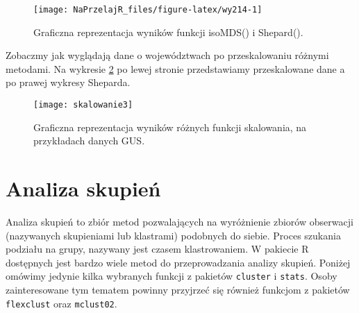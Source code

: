 \documentclass[polish,]{book}
\newenvironment{Shaded}{\begin{snugshade}}{\end{snugshade}}
\newcommand{\CommentTok}[1]{\textcolor[rgb]{0.56,0.35,0.01}{\textit{#1}}}
\newcommand{\DataTypeTok}[1]{\textcolor[rgb]{0.13,0.29,0.53}{#1}}
\newcommand{\DecValTok}[1]{\textcolor[rgb]{0.00,0.00,0.81}{#1}}
\newcommand{\FloatTok}[1]{\textcolor[rgb]{0.00,0.00,0.81}{#1}}
\newcommand{\KeywordTok}[1]{\textcolor[rgb]{0.13,0.29,0.53}{\textbf{#1}}}
\newcommand{\NormalTok}[1]{#1}
\newcommand{\OperatorTok}[1]{\textcolor[rgb]{0.81,0.36,0.00}{\textbf{#1}}}
\newcommand{\StringTok}[1]{\textcolor[rgb]{0.31,0.60,0.02}{#1}}
\begin{document}
\begin{Shaded}
\end{Shaded}

\begin{figure}[h]

{\centering \texttt{[image: NaPrzelajR\_files/figure-latex/wy214-1]} 

}

\caption{Graficzna reprezentacja wyników funkcji isoMDS() i Shepard().}\label{fig:wy214}
\end{figure}

Zobaczmy jak wyglądają dane o województwach po przeskalowaniu różnymi metodami. Na wykresie \ref{fig:skal3} po lewej stronie przedstawiamy przeskalowane dane a po
prawej wykresy Sheparda.

\begin{figure}

{\centering \texttt{[image: skalowanie3]} 

}

\caption{Graficzna reprezentacja wyników różnych funkcji skalowania, na przykładach danych GUS.}\label{fig:skal3}
\end{figure}

\hypertarget{part_3}{%
\chapter{Analiza skupień}\label{part_3}}

Analiza skupień to zbiór metod pozwalających na wyróżnienie zbiorów obserwacji
(nazywanych skupieniami lub klastrami) podobnych do siebie. Proces szukania podziału na grupy, nazywany jest czasem klastrowaniem. W pakiecie R dostępnych
jest bardzo wiele metod do przeprowadzania analizy skupień. Poniżej omówimy jedynie kilka wybranych funkcji z pakietów \texttt{cluster} i \texttt{stats}. Osoby zainteresowane
tym tematem powinny przyjrzeć się również funkcjom z pakietów \texttt{flexclust} oraz
\texttt{mclust02}.
\end{document}
